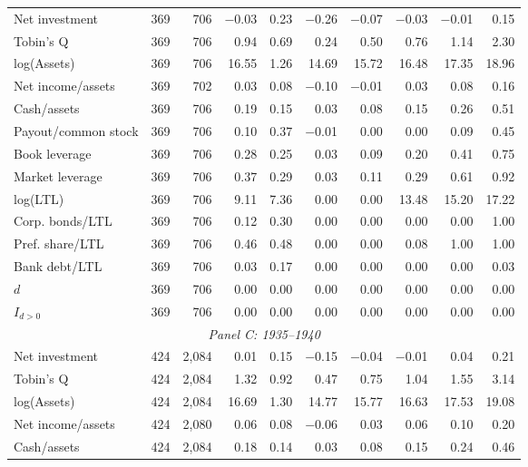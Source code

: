 \begin{table}[p]
\begin{threeparttable}
\begin{tabular}{lrrrrrrrrr}
            \midrule
            Net investment & 369 & 706 & $-$0.03 & 0.23 & $-$0.26 & $-$0.07 & $-$0.03 & $-$0.01 & 0.15 \\
            Tobin's Q & 369 & 706 & 0.94 & 0.69 & 0.24 & 0.50 & 0.76 & 1.14 & 2.30 \\
            log(Assets) & 369 & 706 & 16.55 & 1.26 & 14.69 & 15.72 & 16.48 & 17.35 & 18.96 \\
            Net income/assets & 369 & 702 & 0.03 & 0.08 & $-$0.10 & $-$0.01 & 0.03 & 0.08 & 0.16 \\
            Cash/assets & 369 & 706 & 0.19 & 0.15 & 0.03 & 0.08 & 0.15 & 0.26 & 0.51 \\
            Payout/common stock & 369 & 706 & 0.10 & 0.37 & $-$0.01 & 0.00 & 0.00 & 0.09 & 0.45 \\
            Book leverage & 369 & 706 & 0.28 & 0.25 & 0.03 & 0.09 & 0.20 & 0.41 & 0.75 \\
            Market leverage & 369 & 706 & 0.37 & 0.29 & 0.03 & 0.11 & 0.29 & 0.61 & 0.92 \\
            log(LTL) & 369 & 706 & 9.11 & 7.36 & 0.00 & 0.00 & 13.48 & 15.20 & 17.22 \\
            Corp. bonds/LTL & 369 & 706 & 0.12 & 0.30 & 0.00 & 0.00 & 0.00 & 0.00 & 1.00 \\
            Pref. share/LTL & 369 & 706 & 0.46 & 0.48 & 0.00 & 0.00 & 0.08 & 1.00 & 1.00 \\
            Bank debt/LTL & 369 & 706 & 0.03 & 0.17 & 0.00 & 0.00 & 0.00 & 0.00 & 0.03 \\
            \ensuremath{d} & 369 & 706 & 0.00 & 0.00 & 0.00 & 0.00 & 0.00 & 0.00 & 0.00 \\
            \ensuremath{I_{d>0}} & 369 & 706 & 0.00 & 0.00 & 0.00 & 0.00 & 0.00 & 0.00 & 0.00 \\
            \midrule
            \multicolumn{10}{c}{\textit{Panel C: 1935--1940}} \\
            \midrule
            Net investment & 424 & 2,084 & 0.01 & 0.15 & $-$0.15 & $-$0.04 & $-$0.01 & 0.04 & 0.21 \\
            Tobin's Q & 424 & 2,084 & 1.32 & 0.92 & 0.47 & 0.75 & 1.04 & 1.55 & 3.14 \\
            log(Assets) & 424 & 2,084 & 16.69 & 1.30 & 14.77 & 15.77 & 16.63 & 17.53 & 19.08 \\
            Net income/assets & 424 & 2,080 & 0.06 & 0.08 & $-$0.06 & 0.03 & 0.06 & 0.10 & 0.20 \\
            Cash/assets & 424 & 2,084 & 0.18 & 0.14 & 0.03 & 0.08 & 0.15 & 0.24 & 0.46 \\

\end{tabular}
\end{threeparttable}
\end{table}

